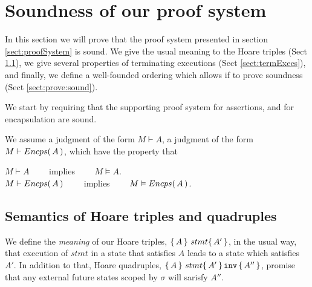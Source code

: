 


\section{Soundness of our proof system}

In this section we will prove that the proof system presented in section \ref{sect:proofSystem} is sound. We give the usual meaning to the Hoare triples (Sect \ref{sect:HLmeans}), we give several properties of terminating executions (Sect \ref{sect:termExecs}), and finally, we define a well-founded ordering which allows if to prove soundness (Sect \ref{sect:prove:sound}).

We start by requiring  that the supporting proof system for assertions, and for encapsulation are sound.
\begin{axiom}
\label{lemma:axiom:enc:assert}
We assume a judgment of the form $M \vdash A$,  a judgment of the form $M \vdash {\ensuremath Encps(\, A\, )}$, which have the property that
\begin{center}
$M \vdash A $ \ \ \ \ implies \ \ \ \ $M \vDash A$.\\
 $M \vdash {\ensuremath Encps(\, A\, )} $ \ \ \ \ implies \ \ \ \ $M \vDash {\ensuremath Encps(\, A\, )}$.
 \end{center}
\end{axiom}


\subsection{Semantics of Hoare triples and quadruples}
\label{sect:HLmeans}

We  define the {\emph {meaning}} of  our Hoare triples, $ \{\, A \, \}\ stmt \{\, A' \, \}$,  in the usual way, \ie that execution of $stmt$ in a state that satisfies $A$ leads to a state which satisfies $A'$.  
In addition to that, Hoare quadruples, $ \{\, A \, \}\ stmt \{\, A' \, \} \, {\texttt{inv}}\, \{\, A'' \, \} $, promise that any external future states scoped by $\sigma$ will sarisfy $A''$.

